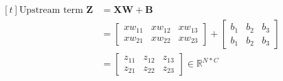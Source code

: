 \documentclass{article}
\begin{document}
\begin{subequations}
\begin{equation}
\begin{aligned}[t]
            \text{Upstream term } \boldsymbol{Z} &= \boldsymbol{X}\boldsymbol{W} + \boldsymbol{B}\\
                                                 &= \begin{bmatrix}
                                                        xw_{11} & xw_{12} & xw_{13}\\
                                                        xw_{21} & xw_{22} & xw_{23}
                                                    \end{bmatrix} +
                                                    \begin{bmatrix}
                                                        b_{1} & b_{2} & b_{3}\\
                                                        b_{1} & b_{2} & b_{3}
                                                    \end{bmatrix}\\
                                                 &= \begin{bmatrix}
                                                        z_{11}  & z_{12} & z_{13}\\
                                                        z_{21}  & z_{22} & z_{23}
                                                    \end{bmatrix}
                                                    \in \mathds{R}^{N*C}
        \end{aligned}
    \end{equation}
\end{subequations}
\end{document}
